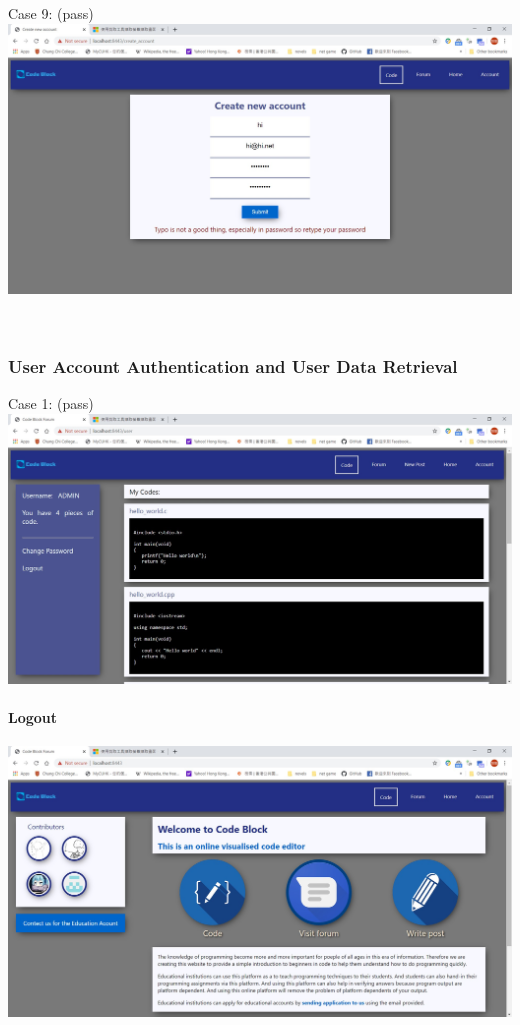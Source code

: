 Case 9: (pass)\\
\includegraphics[scale=0.45]{Doc/Pics/case-5-1-9}

~

\subsubsection{User Account Authentication and User Data Retrieval}
Case 1: (pass)\\
\includegraphics[scale=0.45]{Doc/Pics/case-5-2-1}

\paragraph{Logout}

\includegraphics[scale=0.45]{Doc/Pics/logout}

